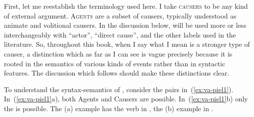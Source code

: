 \begin{exe}
\begin{xlist}
\begin{exe}
\begin{xlist}
\begin{exe}
\begin{xlist}
\begin{exe}
\begin{exe}
\begin{xlist}
\begin{exe}
\begin{xlist}
\begin{exe}
\begin{xlist}
\begin{exe}
\begin{xlist}
\begin{exe}
\begin{xlist}
\begin{exe}
\begin{xlist}
\begin{exe}
\begin{xlist}
\begin{exe}
\begin{xlist}
\begin{exe}
\begin{xlist}
\begin{exe}
\begin{xlist}
\begin{exe}
\begin{xlist}
\begin{exe}
\begin{xlist}
\begin{exe}
\begin{exe}
\begin{xlist}
\begin{exe}
\begin{xlist}
\begin{exe}
\begin{xlist}
\begin{exe}
\begin{xlist}
{\begin{exe}
\begin{xlist}
\begin{exe}
\begin{xlist}
\begin{exe}
\begin{xlist}
\begin{exe}
\begin{xlist}
\begin{xlist}
\begin{xlist}
\begin{exe}
\begin{xlist}
\begin{xlist}
\begin{xlist}
\begin{exe}
\begin{exe}
\begin{xlist}
First, let me reestablish the terminology used here. I take \textsc{causers} to be any kind of external argument. \textsc{Agents} are a subset of causers, typically understood as animate and volitional causers. In the discussion below, \textsc{} will be used more or less interchangeably with ``actor'', ``direct cause'', and the other labels used in the literature. So, throughout this book, when I say \textsc{} what I mean is a stronger type of causer, a distinction which as far as I can see is vague precisely because it is rooted in the semantics of various kinds of events rather than in syntactic features. The discussion which follows should make these distinctions clear.

To understand the syntax-semantics of {\tpie}, consider the pairs in~(\ref{ex:va-piel1}). In~(\ref{ex:va-piel1}a), both Agents and Causers are possible. In~(\ref{ex:va-piel1}b) only the  is possible. The (a) example has the verb in {\tkal}, the (b) example in {\tpie}.

 \begin{exe}
 \ex  \label{ex:va-piel1} 
 \begin{xlist} 
		

\end{xlist}
\end{exe}
\end{xlist}
\end{exe}
\end{exe}
\end{xlist}
\end{xlist}
\end{xlist}
\end{exe}
\end{xlist}
\end{xlist}
\end{xlist}
\end{exe}
\end{xlist}
\end{exe}
\end{xlist}
\end{exe}
\end{xlist}
\end{exe}}
\end{xlist}
\end{exe}
\end{xlist}
\end{exe}
\end{xlist}
\end{exe}
\end{xlist}
\end{exe}
\end{exe}
\end{xlist}
\end{exe}
\end{xlist}
\end{exe}
\end{xlist}
\end{exe}
\end{xlist}
\end{exe}
\end{xlist}
\end{exe}
\end{xlist}
\end{exe}
\end{xlist}
\end{exe}
\end{xlist}
\end{exe}
\end{xlist}
\end{exe}
\end{xlist}
\end{exe}
\end{xlist}
\end{exe}
\end{xlist}
\end{exe}
\end{exe}
\end{xlist}
\end{exe}
\end{xlist}
\end{exe}
\end{xlist}
\end{exe}
